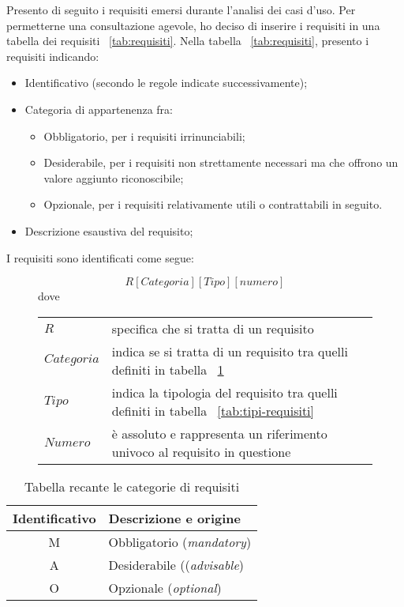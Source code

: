 Presento di seguito i requisiti emersi durante l’analisi dei casi d’uso.
Per permetterne una consultazione agevole, ho deciso di inserire i requisiti in una tabella dei requisiti ~\ref{tab:requisiti}.
Nella tabella ~\ref{tab:requisiti}, presento i requisiti indicando:
\begin{itemize}
	\item Identificativo (secondo le regole indicate successivamente);
	\item Categoria di appartenenza fra:
	\begin{itemize}
		\item Obbligatorio, per i requisiti irrinunciabili;
		\item Desiderabile, per i requisiti non strettamente necessari ma che offrono un
    valore aggiunto riconoscibile;
		\item Opzionale, per i requisiti relativamente utili o contrattabili in seguito.
	\end{itemize}
	\item Descrizione esaustiva del requisito;
\end{itemize}

\newenvironment{conditions}
  {\par\vspace{\abovedisplayskip}\noindent\begin{tabular}{>{$}l<{$} @{${}={}$} l}}
  {\end{tabular}\par\vspace{\belowdisplayskip}}

I requisiti sono identificati come segue:

\begin{figure}
  \centering
  \[ R[Categoria][Tipo][numero] \]
	dove
	\begin{conditions}
    R & specifica che si tratta di un requisito\\
    Categoria & indica se si tratta di un requisito tra quelli definiti in tabella ~\ref{tab:categoria-requisiti}\\
    Tipo & indica la tipologia del requisito tra quelli definiti in tabella ~\ref{tab:tipi-requisiti}\\
		Numero & è assoluto e rappresenta un riferimento univoco al requisito in questione\\
	\end{conditions}
\end{figure}

\begin{table}[H]
\caption{Tabella recante le categorie di requisiti}
\label{tab:categoria-requisiti}
\begin{tabularx}{\linewidth}{|c|X|}
\hline
\textbf{Identificativo} & \textbf{Descrizione e origine} \\
\hline
M & Obbligatorio (\emph{mandatory}) \\
\hline
A & Desiderabile ((\emph{advisable}) \\
\hline
O & Opzionale (\emph{optional}) \\
\hline
\end{tabularx}
\end{table}

